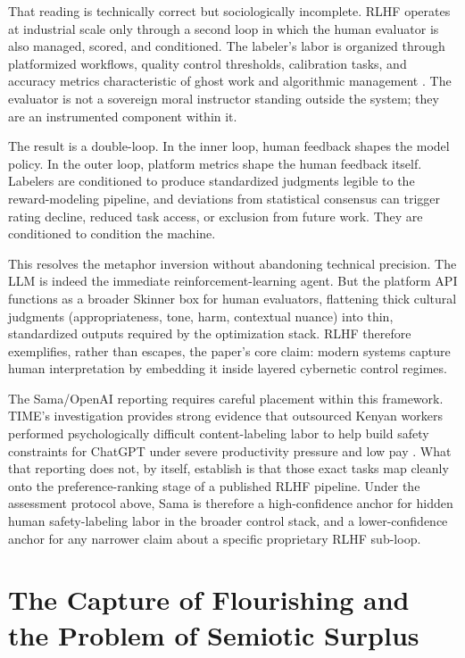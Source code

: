 \documentclass[runningheads]{llncs}
\begin{document}
That reading is technically correct but sociologically incomplete. RLHF operates at industrial scale only through a second loop in which the human evaluator is also managed, scored, and conditioned. The labeler's labor is organized through platformized workflows, quality control thresholds, calibration tasks, and accuracy metrics characteristic of ghost work and algorithmic management \cite{gray2019ghost,kellogg2020algorithms}. The evaluator is not a sovereign moral instructor standing outside the system; they are an instrumented component within it.

The result is a double-loop. In the inner loop, human feedback shapes the model policy. In the outer loop, platform metrics shape the human feedback itself. Labelers are conditioned to produce standardized judgments legible to the reward-modeling pipeline, and deviations from statistical consensus can trigger rating decline, reduced task access, or exclusion from future work. They are conditioned to condition the machine.

This resolves the metaphor inversion without abandoning technical precision. The LLM is indeed the immediate reinforcement-learning agent. But the platform API functions as a broader Skinner box for human evaluators, flattening thick cultural judgments (appropriateness, tone, harm, contextual nuance) into thin, standardized outputs required by the optimization stack. RLHF therefore exemplifies, rather than escapes, the paper's core claim: modern systems capture human interpretation by embedding it inside layered cybernetic control regimes.

The Sama/OpenAI reporting requires careful placement within this framework. TIME's investigation provides strong evidence that outsourced Kenyan workers performed psychologically difficult content-labeling labor to help build safety constraints for ChatGPT under severe productivity pressure and low pay \cite{perrigo2023time}. What that reporting does not, by itself, establish is that those exact tasks map cleanly onto the preference-ranking stage of a published RLHF pipeline. Under the assessment protocol above, Sama is therefore a high-confidence anchor for hidden human safety-labeling labor in the broader control stack, and a lower-confidence anchor for any narrower claim about a specific proprietary RLHF sub-loop.

\section{The Capture of Flourishing and the Problem of Semiotic Surplus}
\end{document}
